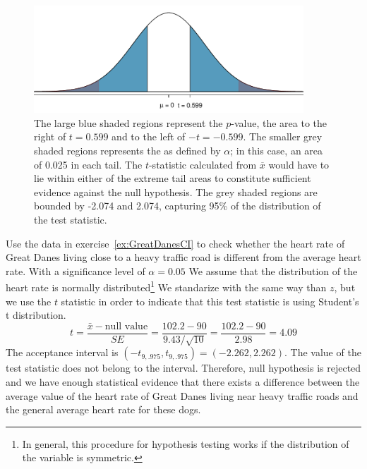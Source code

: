 \begin{figure}[h]
	\centering
	\includegraphics[width=0.9\textwidth]{ch_05a_inference_foundations_oi_biostat/figures/pValueTuna/pValueTuna}
	\caption{The large blue shaded regions represent the $p$-value, the area to the right of $t = 0.599$ and to the left of $-t = -0.599$. The smaller grey shaded regions represents the  as defined by $\alpha$; in this case, an area of 0.025 in each tail. The $t$-statistic calculated from $\overline{x}$ would have to lie within either of the extreme tail areas to constitute sufficient evidence against the null hypothesis. The grey shaded regions are bounded by -2.074 and 2.074,  capturing 95\% of the distribution of the test statistic.}
	\label{pValueTuna}
\end{figure}  

\begin{examplewrap}
\begin{nexample} {Use the data in exercise~\ref{ex:GreatDanesCI} to check whether the heart rate of Great Danes living close to a heavy traffic road is different from the average  heart rate. With a significance level of $\alpha=0.05$}
We assume that the distribution of the heart rate is normally distributed\footnote{In general, this procedure for hypothesis testing works if the distribution of the variable is symmetric. }
 We standarize with the same way than $z$, but we use the $t$ statistic in order to indicate that this test statistic is using Student's t distribution.  
$$t=\frac{\bar{x}-\mbox{null value}}{SE}= \frac{102.2-90}{9.43/\sqrt{10}}=\frac{102.2-90}{2.98}=4.09$$
The acceptance interval is $(-t_{9,.975},t_{9,.975})=(-2.262,2.262)$. The value of the test statistic does not belong to the interval. Therefore, null hypothesis is rejected and we have enough statistical evidence that there exists a difference between the average value of the heart rate of Great Danes living near heavy traffic roads and the general average heart rate for these dogs.
\end{nexample}
\end{examplewrap}

